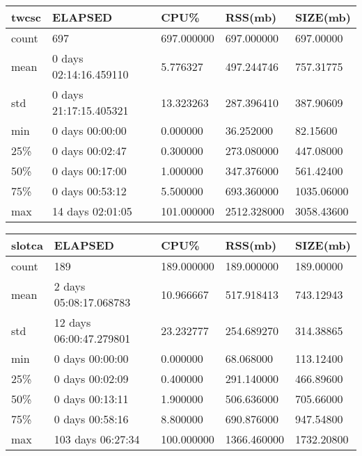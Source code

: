 \documentclass{article}
\begin{document}
\begin{tabular}{|l|l|l|l|l|}
\hline 
\hline twcsc& ELAPSED&   CPU\%&  RSS(mb)&   SIZE(mb) \\
\hline count&    697& 697.000000&  697.000000&  697.00000 \\
\hline mean&  0 days 02:14:16.459110&  5.776327&  497.244746&  757.31775 \\
\hline std&  0 days 21:17:15.405321&  13.323263&  287.396410&  387.90609 \\
\hline min&   0 days 00:00:00&  0.000000&  36.252000&  82.15600 \\
\hline 25\%&   0 days 00:02:47&  0.300000&  273.080000&  447.08000 \\
\hline 50\%&   0 days 00:17:00&  1.000000&  347.376000&  561.42400 \\
\hline 75\%&   0 days 00:53:12&  5.500000&  693.360000& 1035.06000 \\
\hline max&  14 days 02:01:05& 101.000000& 2512.328000& 3058.43600 \\
\hline 
\end{tabular}
 
\begin{tabular}{|l|l|l|l|l|}
\hline 
\hline slotca&    ELAPSED&   CPU\%&  RSS(mb)&   SIZE(mb) \\
\hline count&   189& 189.000000&  189.000000&  189.00000 \\
\hline mean&  2 days 05:08:17.068783&  10.966667&  517.918413&  743.12943 \\
\hline std&  12 days 06:00:47.279801&  23.232777&  254.689270&  314.38865 \\
\hline min&   0 days 00:00:00&  0.000000&  68.068000&  113.12400 \\
\hline 25\%&   0 days 00:02:09&  0.400000&  291.140000&  466.89600 \\
\hline 50\%&   0 days 00:13:11&  1.900000&  506.636000&  705.66000 \\
\hline 75\%&   0 days 00:58:16&  8.800000&  690.876000&  947.54800 \\
\hline max&  103 days 06:27:34& 100.000000& 1366.460000& 1732.20800 \\
\hline 
\end{tabular}
 
\end{document}
